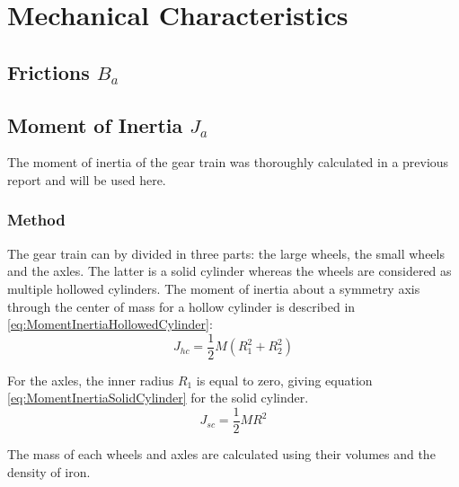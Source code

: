 \section{Mechanical Characteristics}
\subsection{Frictions $B_a$}

\subsection{Moment of Inertia $J_a$}
The moment of inertia of the gear train was thoroughly calculated in a previous report and will be used here.

\subsubsection*{Method}
The gear train can by divided in three parts: the large wheels, the small wheels and the axles. The latter is a solid cylinder whereas the wheels are considered as multiple hollowed cylinders. The moment of inertia about a symmetry axis through the center of mass for a hollow cylinder is described in \autoref{eq:MomentInertiaHollowedCylinder}: 
\begin{equation}
	J_{hc} = \frac{1}{2} M (R_1^2 + R_2^2)
	\label{eq:MomentInertiaHollowedCylinder}
\end{equation}
\startexplain
{}
\stopexplain

For the axles, the inner radius $R_1$ is equal to zero, giving equation \autoref{eq:MomentInertiaSolidCylinder} for the solid cylinder.
\begin{equation}
	J_{sc} = \frac{1}{2} M R^2
	\label{eq:MomentInertiaSolidCylinder}
\end{equation}
\startexplain
{}
\stopexplain

The mass of each wheels and axles are calculated using their volumes and the density of iron.

